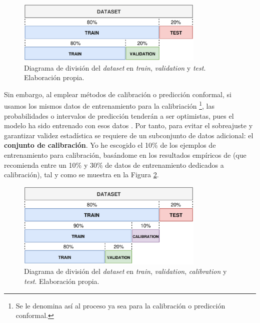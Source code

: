 \begin{figure}[h]
    \centering
    \includegraphics[width=0.8\textwidth]{capitulos/cap_04/imagenes/data_split_base.png}
    \caption[
        Diagrama de división del \textit{dataset} en \textit{train}, \textit{validation} y \textit{test}.
    ]{
        Diagrama de división del \textit{dataset} en \textit{train}, \textit{validation} y \textit{test}. 
        Elaboración propia.
    } 
    \label{fig:data_split_base}
\end{figure}

Sin embargo, al emplear métodos de calibración o predicción conformal, si usamos los mismos datos de 
entrenamiento para la calibriación
\footnote{
    Se le denomina así al proceso ya sea para la calibración o predicción conformal.
}, 
las probabilidades o intervalos de predicción tenderán a ser optimistas, pues el modelo ha sido entrenado
con esos datos \cite{niculescu2005}. Por tanto, para evitar el sobreajuste y garantizar validez estadística 
se requiere de un subconjunto de datos adicional: el \textbf{conjunto de calibración}. Yo he escogido el 
10\% de los ejemplos de entrenamiento para calibración, basándome en los resultados empíricos de 
\cite{sesia2020} (que recomienda entre un 10\% y 30\% de datos de entrenamiento dedicados a calibración), 
tal y como se muestra en la Figura \ref{fig:data_split_conformal}.

\begin{figure}[h]
    \centering
    \includegraphics[width=0.8\textwidth]{capitulos/cap_04/imagenes/data_split_conformal.png}
    \caption[
        Diagrama de división del \textit{dataset} en \textit{train}, \textit{validation}, \textit{calibration} 
        y \textit{test}.
    ]{
        Diagrama de división del \textit{dataset} en \textit{train}, \textit{validation}, \textit{calibration}
        y \textit{test}. Elaboración propia.
    } 
    \label{fig:data_split_conformal}
\end{figure}

